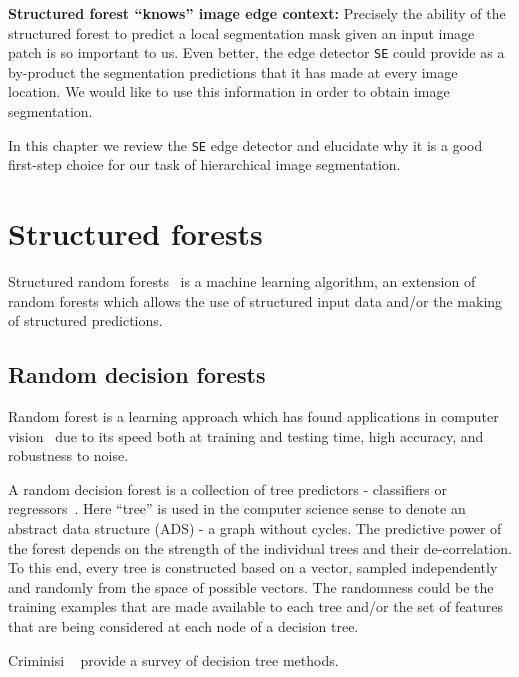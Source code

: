 \textbf{Structured forest ``knows'' image edge context:} Precisely the ability of the structured forest to predict a local segmentation mask given an input image patch is so important to us. Even better, the edge detector {\tt SE} could provide as a by-product the segmentation predictions that it has made at every image location. We would like to use this information in order to obtain image segmentation.

In this chapter we review the {\tt SE} edge detector and elucidate why it is a good first-step choice for our task of hierarchical image segmentation.

\section{Structured forests}
Structured random forests~\cite{KontschiederBBP11,DollarICCV13edges} is a machine learning algorithm, an extension of random forests which allows the use of structured input data and\slash or the making of structured predictions.

\subsection{Random decision forests}
Random forest %
\cite{Breiman01} 
is a 
learning approach which has found applications in computer vision~\cite{KontschiederBBP11,LimZD13,DollarICCV13edges,Dollar2015PAMI} due to its speed both at training and testing time, high accuracy, and robustness to noise.

A random decision forest is a collection %
of tree predictors - classifiers or regressors~\cite{breiman1984classification}. Here ``tree'' is used in the computer science sense to denote an abstract data structure (ADS) - a graph without cycles. 
The predictive power of the forest depends on the strength of the individual trees and their de-correlation. To this end, %
every tree is constructed based on a vector, sampled independently and randomly from the space of possible vectors. The randomness could be \wrt the training examples that are made available to each tree and\slash or the set of features that are being considered at each node of a decision tree.

Criminisi \etal~\cite{Criminisi12} provide a survey of decision tree methods.

